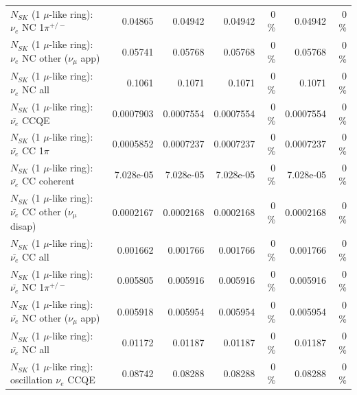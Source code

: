 \begin{table}
\begin{tabular}{| l | r | r | r  r | r  r |}
\hline
                           $N_{SK}$ (1 $\mu$-like ring): $\nu_e$ NC 1$\pi^{+/-}$ &         0.04865 &         0.04942 &         0.04942 &        0 \%  &         0.04942 &        0 \%  \\ 
                  $N_{SK}$ (1 $\mu$-like ring): $\nu_e$ NC other ($\nu_\mu$ app) &         0.05741 &         0.05768 &         0.05768 &        0 \%  &         0.05768 &        0 \%  \\ 
                                  $N_{SK}$ (1 $\mu$-like ring): $\nu_{e}$ NC all &          0.1061 &          0.1071 &          0.1071 &        0 \%  &          0.1071 &        0 \%  \\ 
\hline
\hline
\hline
                                $N_{SK}$ (1 $\mu$-like ring): $\bar{\nu_e}$ CCQE &       0.0007903 &       0.0007554 &       0.0007554 &        0 \%  &       0.0007554 &        0 \%  \\ 
                           $N_{SK}$ (1 $\mu$-like ring): $\bar{\nu_e}$ CC 1$\pi$ &       0.0005852 &       0.0007237 &       0.0007237 &        0 \%  &       0.0007237 &        0 \%  \\ 
                         $N_{SK}$ (1 $\mu$-like ring): $\bar{\nu_e}$ CC coherent &       7.028e-05 &       7.028e-05 &       7.028e-05 &        0 \%  &       7.028e-05 &        0 \%  \\ 
          $N_{SK}$ (1 $\mu$-like ring): $\bar{\nu_e}$ CC other ($\nu_\mu$ disap) &       0.0002167 &       0.0002168 &       0.0002168 &        0 \%  &       0.0002168 &        0 \%  \\ 
                            $N_{SK}$ (1 $\mu$-like ring): $\bar{\nu_{e}}$ CC all &        0.001662 &        0.001766 &        0.001766 &        0 \%  &        0.001766 &        0 \%  \\ 
\hline
                     $N_{SK}$ (1 $\mu$-like ring): $\bar{\nu_e}$ NC 1$\pi^{+/-}$ &        0.005805 &        0.005916 &        0.005916 &        0 \%  &        0.005916 &        0 \%  \\ 
            $N_{SK}$ (1 $\mu$-like ring): $\bar{\nu_e}$ NC other ($\nu_\mu$ app) &        0.005918 &        0.005954 &        0.005954 &        0 \%  &        0.005954 &        0 \%  \\ 
                            $N_{SK}$ (1 $\mu$-like ring): $\bar{\nu_{e}}$ NC all &         0.01172 &         0.01187 &         0.01187 &        0 \%  &         0.01187 &        0 \%  \\ 
\hline
\hline
\hline
                          $N_{SK}$ (1 $\mu$-like ring): oscillation $\nu_e$ CCQE &         0.08742 &         0.08288 &         0.08288 &        0 \%  &         0.08288 &        0 \%  \\ 

\end{tabular}
\end{table}
